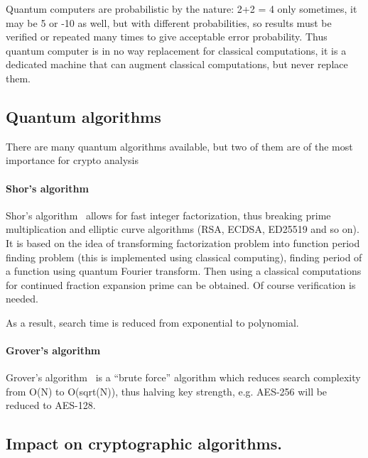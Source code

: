 \documentclass[10pt, a5paper]{article}
\begin{document}
Quantum computers are probabilistic by the nature: 2+2 = 4 only sometimes, it may be 5 or -10 as well, but with different probabilities, so results must be verified or repeated many times to give acceptable error probability. Thus quantum computer is in no way replacement for classical computations, it is a dedicated machine that can augment classical computations, but never replace them.

\subsection*{Quantum algorithms}

There are many quantum algorithms available, but two of them are of the most importance for crypto analysis

\paragraph{Shor's algorithm}

Shor's algorithm~\cite{Savchenko2} allows for fast integer \linebreak factorization, thus breaking prime multiplication and elliptic curve \linebreak algorithms (RSA, ECDSA, ED25519 and so on). It is based on the idea of transforming factorization problem into function period finding problem (this is implemented using classical computing), finding period of a function using quantum Fourier transform. Then using a classical computations for continued fraction expansion prime can be obtained. Of course verification is needed.

As a result, search time is reduced from exponential to polynomial.

\paragraph{Grover's algorithm}

Grover's algorithm~\cite{Savchenko3} is a ``brute force'' algo\-rithm which reduces search complexity from O(N) to O(sqrt(N)), thus halving key strength, e.g. AES-256 will be reduced to AES-128.

\subsection*{Impact on cryptographic algorithms.}
\end{document}
